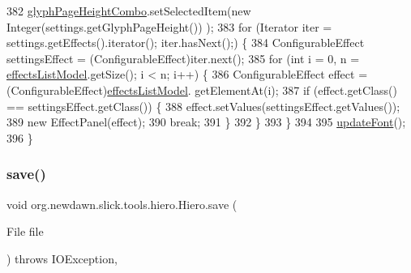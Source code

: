 \begin{DoxyCode}
382         \mbox{\hyperlink{classorg_1_1newdawn_1_1slick_1_1tools_1_1hiero_1_1_hiero_af25be89f1cd46381e5e6fc93a02de118}{glyphPageHeightCombo}}.setSelectedItem(\textcolor{keyword}{new} Integer(settings.getGlyphPageHeight())
      );
383         \textcolor{keywordflow}{for} (Iterator iter = settings.getEffects().iterator(); iter.hasNext();) \{
384             ConfigurableEffect settingsEffect = (ConfigurableEffect)iter.next();
385             \textcolor{keywordflow}{for} (\textcolor{keywordtype}{int} i = 0, n = \mbox{\hyperlink{classorg_1_1newdawn_1_1slick_1_1tools_1_1hiero_1_1_hiero_ace6d63639e4675334744afbdad439e98}{effectsListModel}}.getSize(); i < n; i++) \{
386                 ConfigurableEffect effect = (ConfigurableEffect)\mbox{\hyperlink{classorg_1_1newdawn_1_1slick_1_1tools_1_1hiero_1_1_hiero_ace6d63639e4675334744afbdad439e98}{effectsListModel}}.
      getElementAt(i);
387                 \textcolor{keywordflow}{if} (effect.getClass() == settingsEffect.getClass()) \{
388                     effect.setValues(settingsEffect.getValues());
389                     \textcolor{keyword}{new} EffectPanel(effect);
390                     \textcolor{keywordflow}{break};
391                 \}
392             \}
393         \}
394 
395         \mbox{\hyperlink{classorg_1_1newdawn_1_1slick_1_1tools_1_1hiero_1_1_hiero_aaee4b931c33090913c970c8484c90af7}{updateFont}}();
396     \}
\end{DoxyCode}
\mbox{\label{classorg_1_1newdawn_1_1slick_1_1tools_1_1hiero_1_1_hiero_a078b77ff73e2286fc28b18c9a4f318a6}} 
\subsubsection{\texorpdfstring{save()}{save()}}
{\footnotesize\ttfamily void org.\+newdawn.\+slick.\+tools.\+hiero.\+Hiero.\+save (\begin{DoxyParamCaption}\item[{File}]{file }\end{DoxyParamCaption}) throws I\+O\+Exception\hspace{0.3cm}{\ttfamily [inline]}, {\ttfamily [package]}}


